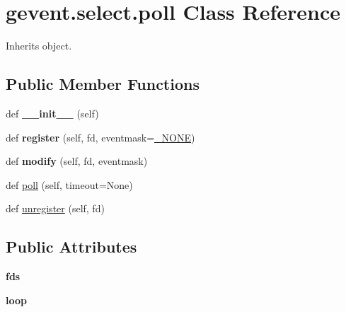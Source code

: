 \hypertarget{classgevent_1_1select_1_1poll}{}\section{gevent.\+select.\+poll Class Reference}
\label{classgevent_1_1select_1_1poll}


Inherits object.

\subsection*{Public Member Functions}
\begin{DoxyCompactItemize}
\item 
\mbox{\label{classgevent_1_1select_1_1poll_aa57bb6ca46315d462b37a6af858b53b3}} 
def {\bfseries \+\_\+\+\_\+init\+\_\+\+\_\+} (self)
\item 
\mbox{\label{classgevent_1_1select_1_1poll_abe9ce1c1e33875fdfc6204f51c3b9e34}} 
def {\bfseries register} (self, fd, eventmask=\hyperlink{classgevent_1_1__util_1_1___n_o_n_e}{\+\_\+\+N\+O\+NE})
\item 
\mbox{\label{classgevent_1_1select_1_1poll_aa4c435ed2f6f4dbe27854907a3e83c63}} 
def {\bfseries modify} (self, fd, eventmask)
\item 
def \hyperlink{classgevent_1_1select_1_1poll_af70f7d5747b1e8750dc9ad6e3173ecdf}{poll} (self, timeout=None)
\item 
def \hyperlink{classgevent_1_1select_1_1poll_a5aecc5148e5d2f45dc2a6bda4804c135}{unregister} (self, fd)
\end{DoxyCompactItemize}
\subsection*{Public Attributes}
\begin{DoxyCompactItemize}
\item 
\mbox{\label{classgevent_1_1select_1_1poll_a0c3f1bdef0601ac16e5c075033c29585}} 
{\bfseries fds}
\item 
\mbox{\label{classgevent_1_1select_1_1poll_a25b362e2d273c69239c6cbbeddc36a66}} 
{\bfseries loop}
\end{DoxyCompactItemize}


